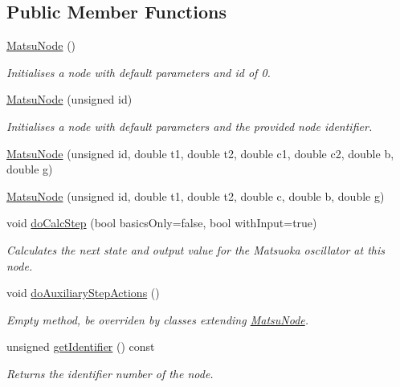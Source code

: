 \subsection*{Public Member Functions}
\begin{DoxyCompactItemize}
\item 
\hyperlink{classMatsuNode_ad0f98260ecf5e9b0173ace6ac087114e}{Matsu\+Node} ()
\begin{DoxyCompactList}\small\item\em Initialises a node with default parameters and id of 0. \end{DoxyCompactList}\item 
\hyperlink{classMatsuNode_a0c502c97d26d0e87831e70814d7f1576}{Matsu\+Node} (unsigned id)
\begin{DoxyCompactList}\small\item\em Initialises a node with default parameters and the provided node identifier. \end{DoxyCompactList}\item 
\hyperlink{classMatsuNode_a424409287edb672d04f85a6b842f1a07}{Matsu\+Node} (unsigned id, double t1, double t2, double c1, double c2, double b, double g)
\item 
\hyperlink{classMatsuNode_aef8572f9660b43e67d1c3fe83693eb96}{Matsu\+Node} (unsigned id, double t1, double t2, double c, double b, double g)
\item 
void \hyperlink{classMatsuNode_a10c0280241d0be2e50d89af136d279dc}{do\+Calc\+Step} (bool basics\+Only=false, bool with\+Input=true)
\begin{DoxyCompactList}\small\item\em Calculates the next state and output value for the Matsuoka oscillator at this node. \end{DoxyCompactList}\item 
void \hyperlink{classMatsuNode_a7a537f1cb21eee2652086d022ab41eb8}{do\+Auxiliary\+Step\+Actions} ()
\begin{DoxyCompactList}\small\item\em Empty method, be overriden by classes extending \hyperlink{classMatsuNode}{Matsu\+Node}. \end{DoxyCompactList}\item 
unsigned \hyperlink{classMatsuNode_ab3232ce81af9d2ea55400a248bd1217e}{get\+Identifier} () const 
\begin{DoxyCompactList}\small\item\em Returns the identifier number of the node. \end{DoxyCompactList}\item 

\end{DoxyCompactItemize}

